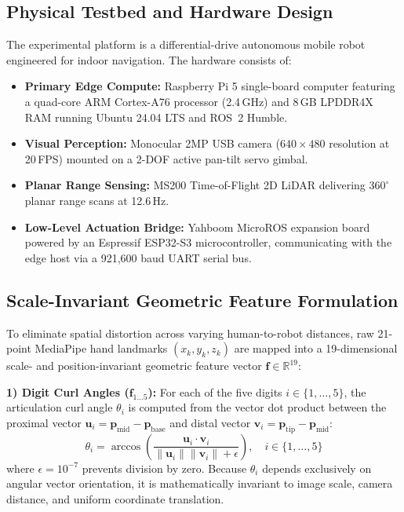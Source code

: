 \documentclass[conference]{IEEEtran}
\begin{document}
\subsection{Physical Testbed and Hardware Design}
The experimental platform is a differential-drive autonomous mobile robot engineered for indoor navigation. The hardware consists of:
\begin{itemize}
    \item \textbf{Primary Edge Compute:} Raspberry Pi 5 single-board computer featuring a quad-core ARM Cortex-A76 processor (2.4\,GHz) and 8\,GB LPDDR4X RAM running Ubuntu 24.04 LTS and ROS~2 Humble.
    \item \textbf{Visual Perception:} Monocular 2MP USB camera ($640 \times 480$ resolution at 20\,FPS) mounted on a 2-DOF active pan-tilt servo gimbal.
    \item \textbf{Planar Range Sensing:} MS200 Time-of-Flight 2D LiDAR delivering $360^\circ$ planar range scans at 12.6\,Hz.
    \item \textbf{Low-Level Actuation Bridge:} Yahboom MicroROS expansion board powered by an Espressif ESP32-S3 microcontroller, communicating with the edge host via a 921,600 baud UART serial bus.
\end{itemize}

\subsection{Scale-Invariant Geometric Feature Formulation}
To eliminate spatial distortion across varying human-to-robot distances, raw 21-point MediaPipe hand landmarks $(x_k, y_k, z_k)$ are mapped into a 19-dimensional scale- and position-invariant geometric feature vector $\mathbf{f} \in \mathbb{R}^{19}$:

\textbf{1) Digit Curl Angles ($\mathbf{f}_{1\dots5}$):} For each of the five digits $i \in \{1,\dots,5\}$, the articulation curl angle $\theta_i$ is computed from the vector dot product between the proximal vector $\mathbf{u}_i = \mathbf{p}_{\text{mid}} - \mathbf{p}_{\text{base}}$ and distal vector $\mathbf{v}_i = \mathbf{p}_{\text{tip}} - \mathbf{p}_{\text{mid}}$:
\begin{equation}
\theta_i = \arccos\left( \frac{\mathbf{u}_i \cdot \mathbf{v}_i}{\|\mathbf{u}_i\| \|\mathbf{v}_i\| + \epsilon} \right), \quad i \in \{1,\dots,5\}
\end{equation}
where $\epsilon = 10^{-7}$ prevents division by zero. Because $\theta_i$ depends exclusively on angular vector orientation, it is mathematically invariant to image scale, camera distance, and uniform coordinate translation.
\end{document}
